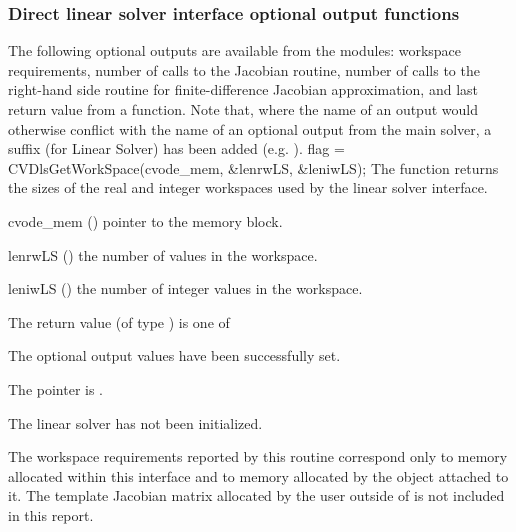 \subsubsection{Direct linear solver interface optional output functions}
\label{sss:optout_dls}
The following optional outputs are available from the {\cvdls} modules:
workspace requirements, number of calls to the Jacobian routine, number of 
calls to the right-hand side routine for finite-difference Jacobian approximation,
and last return value from a {\cvdls} function.
Note that, where the name of an output would otherwise conflict with
the name of an optional output from the main solver, a suffix 
(for Linear Solver) has been added (e.g. ).
{
  flag = CVDlsGetWorkSpace(cvode\_mem, \&lenrwLS, \&leniwLS);
}
{
  The function  returns the sizes of the real and
  integer workspaces used by the {\cvdls} linear solver interface.
}
{
  \begin{args}
  \item[cvode\_mem] ()
    pointer to the {\cvode} memory block.
  \item[lenrwLS] ()
    the number of  values in the {\cvdls} workspace.
  \item[leniwLS] ()
    the number of integer values in the {\cvdls} workspace.
  \end{args}
}
{
  The return value  (of type ) is one of
  \begin{args}
  \item[\Id{CVDLS\_SUCCESS}] 
    The optional output values have been successfully set.
  \item[\Id{CVDLS\_MEM\_NULL}]
    The  pointer is .
  \item[\Id{CVDLS\_LMEM\_NULL}]
    The {\cvdls} linear solver has not been initialized.
  \end{args}
}
{
  The workspace requirements reported by this routine correspond only
  to memory allocated within this interface and to memory allocated by
  the {\sunlinsol} object attached to it.  The template Jacobian
  matrix allocated by the user outside of {\cvdls} is not included in
  this report.
}
